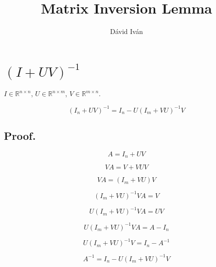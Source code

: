 \documentclass{article}
\title{Matrix Inversion Lemma}
\author{Dávid Iván}
\begin{document}
\maketitle

\tableofcontents

\newpage

\section{$(I + UV)^{-1}$}

$I \in \mathbb{R}^{n\times n}$, $U \in \mathbb{R}^{n\times m}$, $V \in \mathbb{R}^{m\times n}$.

\begin{equation} \label{eq:I_UV}
    \boxed{(I_n + UV)^{-1} = I_n - U(I_m + VU)^{-1}V}
\end{equation}

\subsection{Proof.}

\begin{equation}
    A = I_n + UV
\end{equation}

\begin{equation}
    V A = V + VUV
\end{equation}

\begin{equation}
    V A = (I_m + VU)V
\end{equation}

\begin{equation}
    (I_m + VU)^{-1}V A = V
\end{equation}

\begin{equation}
    U(I_m + VU)^{-1}V A = UV
\end{equation}

\begin{equation}
    U(I_m + VU)^{-1}V A = A - I_n
\end{equation}

\begin{equation}
    U(I_m + VU)^{-1}V = I_n - A^{-1}
\end{equation}

\begin{equation}
    A^{-1} = I_n - U(I_m + VU)^{-1}V
\end{equation}
\end{document}

